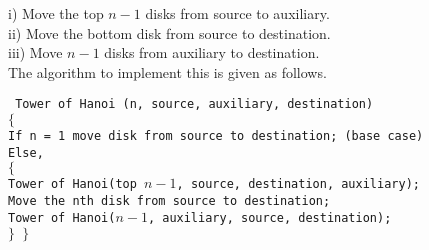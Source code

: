 \documentclass[9pt]{beamer}
\begin{document}
\begin{frame}
i) Move the top $n - 1$ disks from source to auxiliary.\\
ii) Move the bottom disk from source to destination.\\
iii) Move $n - 1$ disks from auxiliary to destination.\\

\vspace*{0.2cm}
The algorithm to implement this is given as follows.\\
\vspace*{0.1cm}

\small{
\texttt{
\hspace*{1cm} Tower of Hanoi (n, source, auxiliary, destination)\\
\hspace*{1.5cm} $\{$ \\
\hspace*{2cm} If n = 1 move disk from source to destination; (base case)\\
\hspace*{2cm} Else,\\
\hspace*{2.5cm} $\{$ \\
\hspace*{3cm}  Tower of Hanoi(top $n - 1$, source, destination, auxiliary);\\
\hspace*{3cm} Move the nth disk from source to destination;\\
\hspace*{3cm} Tower of Hanoi($n - 1$, auxiliary, source, destination);\\
\hspace*{2.5cm} $\}$
\hspace*{1.5cm} $\}$
}
}
\end{frame}
\end{document}
